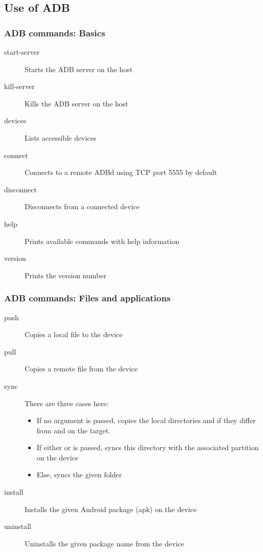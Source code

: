 \subsection{Use of ADB}
\begin{frame}
  \frametitle{ADB commands: Basics}
  \begin{description}
  \item[start-server] Starts the ADB server on the host
  \item[kill-server] Kills the ADB server on the host
  \item[devices] Lists accessible devices
  \item[connect] Connects to a remote ADBd using TCP port
    5555 by default
  \item[disconnect] Disconnects from a connected device
  \item[help] Prints available commands with help information 
  \item[version] Prints the version number
  \end{description}
\end{frame}

\begin{frame}
  \frametitle{ADB commands: Files and applications}
  \begin{description}
  \item[push] Copies a local file to the device
  \item[pull] Copies a remote file from the device
  \item[sync] There are three cases here:
    \begin{itemize}
    \item If no argument is passed, copies the local directories
       and  if they differ from 
      and  on the target.
    \item If either  or  is passed, syncs this
      directory with the associated partition on the device
    \item Else, syncs the given folder
    \end{itemize}
  \item[install] Installs the given Android package (apk) on the device
  \item[uninstall] Uninstalls the given package name from the device
  \end{description}
\end{frame}

